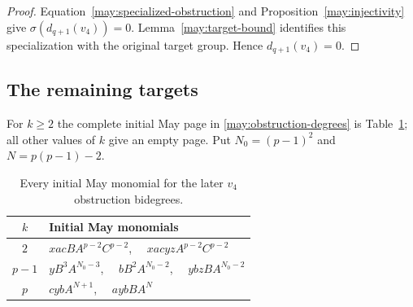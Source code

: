 \begin{proof}
Equation~\eqref{may:specialized-obstruction} and
Proposition~\ref{may:injectivity} give
$\sigma(d_{q+1}(v_4))=0$. Lemma~\ref{may:target-bound} identifies
this specialization with the original target group. Hence
$d_{q+1}(v_4)=0$.
\end{proof}

\subsection{The remaining targets}

\begin{proposition}
\label{may:remaining-list}
For $k\geq2$ the complete initial May page in
\eqref{may:obstruction-degrees} is Table~\ref{may:remaining-table}; all
other values of $k$ give an empty page.  Put
$N_0=(p-1)^2$ and $N=p(p-1)-2$.
\begin{table}[htbp]
\centering
\begin{tabular}{c l}
\toprule
$k$ & Initial May monomials\\
\midrule
$2$ & $xac B A^{p-2}C^{p-2}$,
       $\quad xacyz A^{p-2}C^{p-2}$\\[2pt]
$p-1$ & $y B^3 A^{N_0-3}$,
         $\quad b B^2 A^{N_0-2}$,
         $\quad ybz B A^{N_0-2}$\\[2pt]
$p$ & $cyb A^{N+1}$,
       $\quad ayb B A^N$\\
\bottomrule
\end{tabular}
\caption{Every initial May monomial for the later $v_4$ obstruction
bidegrees.}
\label{may:remaining-table}
\end{table}
\end{proposition}

